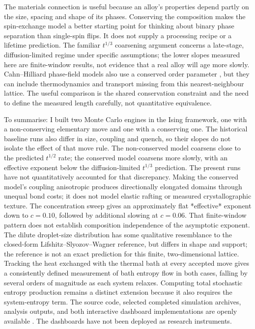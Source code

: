 \documentclass[11pt]{article}
\begin{document}
The materials connection is useful because an alloy's properties depend
partly on the size, spacing and shape of its phases. Conserving the
composition makes the spin-exchange model a better starting point for
thinking about binary phase separation than single-spin flips. It does
not supply a processing recipe or a lifetime prediction. The familiar
$t^{1/3}$ coarsening argument concerns a late-stage, diffusion-limited
regime under specific assumptions; the lower slopes measured here are
finite-window results, not evidence that a real alloy will age more
slowly. Cahn--Hilliard phase-field models also use a conserved order
parameter \cite{CahnHilliard1958}, but they can include thermodynamics and
transport missing from this nearest-neighbour lattice. The useful
comparison is the shared conservation constraint and the need to define
the measured length carefully, not quantitative equivalence.

To summarise: I built two Monte Carlo engines in the Ising framework,
one with a non-conserving elementary move and one with a conserving one.
The historical baseline runs also differ in size, coupling and quench,
so their slopes do not isolate the effect of that move rule.
The non-conserved model coarsens close to the predicted $t^{1/2}$ rate;
the conserved model coarsens more slowly, with an effective exponent below
the diffusion-limited $t^{1/3}$ prediction. The present runs have not
quantitatively accounted for that discrepancy. Making the conserved model's
coupling anisotropic produces directionally elongated domains through unequal
bond costs; it does not model elastic rafting or measured crystallographic
texture. The concentration sweep gives an approximately flat *effective*
exponent down to $c=0.10$, followed by additional slowing at $c=0.06$.
That finite-window pattern does not establish composition independence of
the asymptotic exponent. The dilute droplet-size distribution has some
qualitative resemblance to the closed-form Lifshitz--Slyozov--Wagner
reference, but differs in shape and support; the reference is not an exact
prediction for this finite, two-dimensional lattice. Tracking
the heat exchanged with the thermal bath at every accepted move gives a
consistently defined measurement of bath entropy flow in both cases, falling
by several orders of magnitude as each system relaxes. Computing total
stochastic entropy production remains a distinct extension because it also
requires the system-entropy term.
The source code, selected completed simulation archives, analysis outputs,
and both interactive dashboard implementations are openly available
\cite{CodeRepo}. The dashboards have not been deployed as research instruments.
\end{document}
